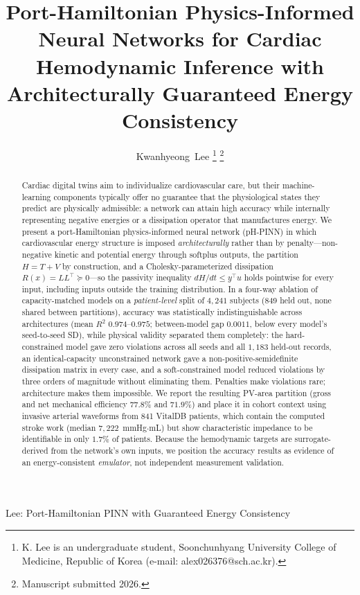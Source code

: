\documentclass[journal]{IEEEtran}
\begin{document}
\title{Port-Hamiltonian Physics-Informed Neural Networks for Cardiac Hemodynamic Inference with Architecturally Guaranteed Energy Consistency}

\author{Kwanhyeong~Lee%
\thanks{K. Lee is an undergraduate student, Soonchunhyang University College of Medicine, Republic of Korea (e-mail: alex026376@sch.ac.kr).}%
\thanks{Manuscript submitted 2026.}}

%
{Lee: Port-Hamiltonian PINN with Guaranteed Energy Consistency}

\maketitle

\begin{abstract}
Cardiac digital twins aim to individualize cardiovascular care, but their machine-learning components typically offer no guarantee that the physiological states they predict are physically admissible: a network can attain high accuracy while internally representing negative energies or a dissipation operator that manufactures energy. We present a port-Hamiltonian physics-informed neural network (pH-PINN) in which cardiovascular energy structure is imposed \emph{architecturally} rather than by penalty---non-negative kinetic and potential energy through softplus outputs, the partition $H=T+V$ by construction, and a Cholesky-parameterized dissipation $R(x)=LL^{\top}\succeq0$---so the passivity inequality $dH/dt\le y^{\top}u$ holds pointwise for every input, including inputs outside the training distribution. In a four-way ablation of capacity-matched models on a \emph{patient-level} split of $4{,}241$ subjects (849 held out, none shared between partitions), accuracy was statistically indistinguishable across architectures (mean $R^2$ $0.974$--$0.975$; between-model gap $0.0011$, below every model's seed-to-seed SD), while physical validity separated them completely: the hard-constrained model gave zero violations across all seeds and all $1{,}183$ held-out records, an identical-capacity unconstrained network gave a non-positive-semidefinite dissipation matrix in every case, and a soft-constrained model reduced violations by three orders of magnitude without eliminating them. Penalties make violations rare; architecture makes them impossible. We report the resulting PV-area partition (gross and net mechanical efficiency $77.8\%$ and $71.9\%$) and place it in cohort context using invasive arterial waveforms from 841 VitalDB patients, which contain the computed stroke work (median $7{,}222$~mmHg$\cdot$mL) but show characteristic impedance to be identifiable in only $1.7\%$ of patients. Because the hemodynamic targets are surrogate-derived from the network's own inputs, we position the accuracy results as evidence of an energy-consistent \emph{emulator}, not independent measurement validation.
\end{abstract}
\end{document}
